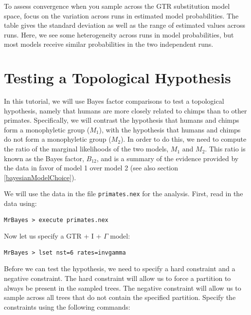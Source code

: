 \documentclass[12pt]{book}
\newcommand{\ttt}[1]{\texttt{#1}}
\begin{document}
To assess convergence when you sample across the GTR substitution model space, focus on the
variation across runs in estimated model probabilities. The table gives the standard deviation as
well as the range of estimated values across runs. Here, we see some heterogeneity across runs in
model probabilities, but most models receive similar probabilities in the two independent runs.


\section{Testing a Topological Hypothesis}

In this tutorial, we will use Bayes factor comparisons to test a topological hypothesis, namely
that humans are more closely related to chimps than to other primates. Specifically, we will
contrast the hypothesis that humans and chimps form a monophyletic group ($M_{1}$), with the
hypothesis that humans and chimps do not form a monophyletic group ($M_{2}$). In order to do this,
we need to compute the ratio of the marginal likelihoods of the two models, $M_{1}$ and $M_{2}$.
This ratio is known as the Bayes factor, $B_{12}$, and is a summary of the evidence provided by the
data in favor of model 1 over model 2 \citep{kass95} (see also section \ref{bayesianModelChoice}).

We will use the data in the file \ttt{primates.nex} for the analysis. First, read in the data
using:

\begin{singlespacing}
\small
\begin{verbatim}
MrBayes > execute primates.nex
\end{verbatim}
\end{singlespacing}
\normalsize

Now let us specify a GTR + I + $\Gamma$ model:

\begin{singlespacing}
\small
\begin{verbatim}
MrBayes > lset nst=6 rates=invgamma
\end{verbatim}
\end{singlespacing}
\normalsize

Before we can test the hypothesis, we need to specify a hard constraint and a negative constraint.
The hard constraint will allow us to force a partition to always be present in the sampled trees.
The negative constraint will allow us to sample across all trees that do not contain the specified
partition. Specify the constraints using the following commands:
\end{document}
